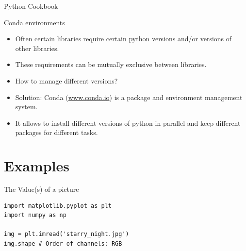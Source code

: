 \documentclass[compress%
,aspectratio=169%
]{beamer}
\begin{document}
\begin{frame}{Python Cookbook}

\begin{figure}
    \centering
    \label{fig:enter-label}
\end{figure}

\end{frame}

\begin{frame}[fragile]{Conda environments}
\begin{itemize}
    \item Often certain libraries require certain python versions and/or versions of other libraries.
    \item These requirements can be mutually exclusive between libraries.
    \item How to manage different versions?
    \item \alert{Solution:} Conda (\url{www.conda.io}) is a package and environment management system.
    \item It allows to install different versions of python in parallel and keep different packages for different tasks.
    
\end{itemize}
\end{frame}




\section{Examples}


\begin{frame}[fragile]{The Value(s) of a picture}
\begin{figure}
    \centering
\end{figure}
\begin{lstlisting}
import matplotlib.pyplot as plt
import numpy as np

img = plt.imread('starry_night.jpg')
img.shape # Order of channels: RGB
\end{lstlisting}
\end{frame}
\end{document}
